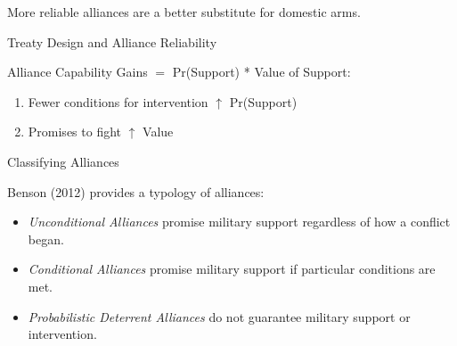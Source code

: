 \documentclass{beamer}
\begin{document}
 
\begin{frame}[standout]

More reliable alliances are a better substitute for domestic arms. 

\end{frame}



\begin{frame}{Treaty Design and Alliance Reliability}

\pause

Alliance Capability Gains $=$ Pr(Support) * Value of Support:

\pause

\begin{enumerate}

\item Fewer conditions for intervention $\uparrow$ Pr(Support)

\pause

\item Promises to fight $\uparrow$ Value 


\end{enumerate} 


\end{frame}


\begin{frame}{Classifying Alliances}

Benson (2012) provides a typology of alliances:



\begin{itemize}

\pause

\item \textit{Unconditional Alliances} promise military support regardless of how a conflict began. 

\pause

\item \textit{Conditional Alliances} promise military support if particular conditions are met. 

\pause

\item \textit{Probabilistic Deterrent Alliances} do not guarantee military support or intervention.

\end{itemize}


\end{frame}
\end{document}
